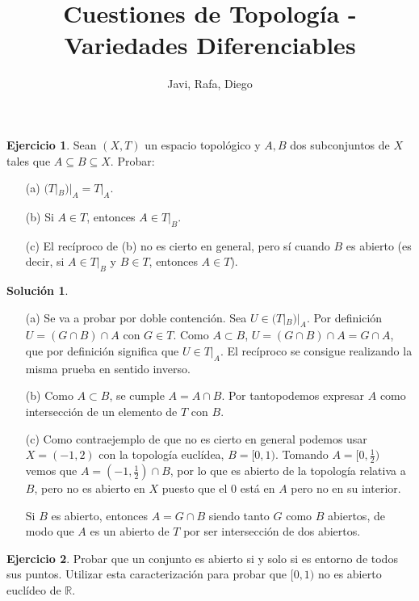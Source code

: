 \documentclass{article}
\theoremstyle{plain}
\theoremstyle{definition}
\newtheorem{exercise}{Ejercicio}
\newtheorem*{sol*}{Solución}
\newcommand{\R}{\mathbb{R}}
\begin{document}
\title{Cuestiones de Topología - Variedades Diferenciables}
\author{Javi, Rafa, Diego}
\maketitle

\begin{exercise}

Sean $(X,T)$ un espacio topológico y $A,B$ dos subconjuntos de $X$ tales que $A\subseteq B\subseteq X$. Probar:
\begin{itemize}
\item[(a)] $(T|_B)|_A=T|_A$.
\item[(b)] Si $A\in T$, entonces $A\in T|_B$.
\item[(c)] El recíproco de (b) no es cierto en general, pero sí cuando $B$ es abierto (es decir, si $A\in T|_B$ y $B\in T$, entonces $A\in T$).
\end{itemize}

\end{exercise}
\begin{sol*}\
\begin{itemize}
\item[(a)] Se va a probar por doble contención. Sea $U\in (T|_B)|_A$. Por definición $U= (G\cap B)\cap A$ con $G\in T$. Como $A\subset B$, $U=(G\cap B)\cap A=G\cap A$, que por definición significa que $U\in T|_A$. El recíproco se consigue realizando la misma prueba en sentido inverso. 
\item[(b)] Como $A\subset B$, se cumple $A=A\cap B$. Por tantopodemos expresar $A$ como intersección de un elemento de $T$ con $B$.
\item[(c)] Como contraejemplo de que no es cierto en general podemos usar $X=(-1,2)$ con la topología euclídea, $B=[0,1)$. Tomando $A=[0,\frac{1}{2})$ vemos que $A=(-1,\frac{1}{2})\cap B$, por lo que es abierto de la topología relativa a $B$, pero no es abierto en $X$ puesto que el $0$ está en $A$ pero no en su interior.

Si $B$ es abierto, entonces $A=G\cap B$ siendo tanto $G$ como $B$ abiertos, de modo que $A$ es un abierto de $T$ por ser intersección de dos abiertos.
\end{itemize}

\end{sol*}

\begin{exercise}\label{2}
Probar que un conjunto es abierto si y solo si es entorno de todos sus puntos. Utilizar esta caracterización para probar que $[0,1)$ no es abierto euclídeo de $\R$.
\end{exercise}
\end{document}
